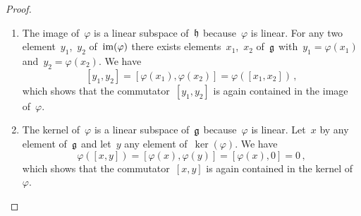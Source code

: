 \begin{proof}
  \leavevmode
  \begin{enumerate}
    \item
      The image of~$\varphi$ is a linear subspace of~$\mathfrak{h}$ because~$\varphi$ is linear.
      For any two element~$y_1$,~$y_2$ of~$\operatorname{im}(\varphi)$ there exists elements~$x_1$,~$x_2$ of~$\mathfrak{g}$ with~$y_1 = \varphi(x_1)$ and~$y_2 = \varphi(x_2)$.
      We have
      \[
        [y_1, y_2]
        =
        [ \varphi(x_1), \varphi(x_2) ]
        =
        \varphi( [x_1, x_2] ) \,,
      \]
      which shows that the commutator~$[y_1, y_2]$ is again contained in the image of~$\varphi$.
    \item
      The kernel of~$\varphi$ is a linear subspace of~$\mathfrak{g}$ because~$\varphi$ is linear.
      Let~$x$ by any element of~$\mathfrak{g}$ and let~$y$ any element of~$\ker(\varphi)$.
      We have
      \[
        \varphi( [x, y] )
        =
        [ \varphi(x), \varphi(y) ]
        =
        [ \varphi(x), 0 ]
        =
        0 \,,
      \]
      which shows that the commutator~$[x, y]$ is again contained in the kernel of~$\varphi$.
    \qedhere
  \end{enumerate}
\end{proof}


